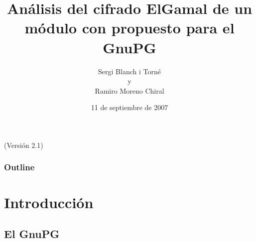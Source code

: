 \documentclass{beamer}
\title[An\'alisis de ElGamal con \ces{} para el GnuPG]{An\'alisis del cifrado ElGamal de un m\'odulo con \ces{} propuesto para el GnuPG}
\author[Sergi Blanch y Ramiro Moreno]{Sergi Blanch i Torn\'e \\ y \\ Ramiro Moreno Chiral}
\institute[Universidad de Lleida]{Criptograf\'{\i}a y Grafos\\ Departamento de Matem\'aticas\\ Universidad de Lleida}
\date{11 de septiembre de 2007}
\newcommand{\version}[1]{\begin{center}{\footnotesize (Versi\'on #1)}\end{center}}
\theoremstyle{plain}        			%
\theoremstyle{definition}   			%
\theoremstyle{saltolinea}   			%
\begin{document}
\begin{frame}
  \titlepage
  \version{2.1}
\end{frame}


\begin{frame}
\frametitle{Outline}
\tableofcontents[hideallsubsections]
\end{frame}



\section{Introducci\'on}

\subsection{El GnuPG}
\end{document}
